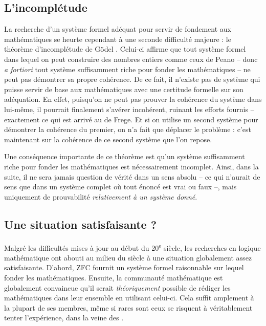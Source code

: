 \subsection{L’incomplétude}

La recherche d’un système formel adéquat pour servir de fondement aux mathématiques 
se heurte cependant à une seconde difficulté majeure : le théorème d’incomplétude de
Gödel . Celui-ci affirme que tout système formel
dans lequel on peut construire des nombres entiers comme ceux de Peano – donc
\textit{a fortiori} tout système suffisamment riche pour fonder les mathématiques –
ne peut pas démontrer sa propre cohérence.%
De ce fait, il n’existe pas de
système qui puisse servir de base aux mathématiques
avec une certitude formelle sur son adéquation.
En effet, puisqu’on ne peut pas prouver la cohérence du
système dans lui-même, il pourrait finalement s’avérer incohérent, ruinant les
efforts fournis – exactement ce qui est arrivé au  de Frege.
Et si on utilise un second système pour démontrer la cohérence du premier, on n’a fait que
déplacer le problème : c’est maintenant sur la cohérence de ce second système que l’on repose.

Une conséquence importante de ce théorème est qu’un système suffisamment riche
pour fonder les mathématiques est nécessairement incomplet.%
Ainsi, dans la suite, il ne sera jamais question de vérité dans un sens absolu –
ce qui n’aurait de sens que dans un système complet
où tout énoncé est vrai ou faux –, mais
uniquement de prouvabilité \emph{relativement à un système donné}.

\subsection{Une situation satisfaisante ?}

Malgré les difficultés mises à jour au début du 20\textsuperscript{e}
siècle, les recherches en logique mathématique ont abouti au milieu du siècle à une situation
globalement assez satisfaisante. D’abord, ZFC fournit un système formel raisonnable sur
lequel fonder les mathématiques. Ensuite,
la communauté mathématique est globalement convaincue qu’il serait
\emph{théoriquement} possible de rédiger les mathématiques dans leur ensemble
en utilisant celui-ci. Cela suffit amplement à la plupart de ses membres,
même si rares sont ceux se risquent à véritablement tenter l’expérience, dans la veine
des .

